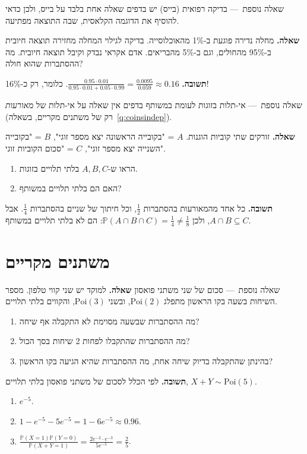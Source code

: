 \documentclass[11pt,a4paper]{report}
\newcommand{\PP}{\mathbb{P}}
\newcommand{\Poi}{\mathrm{Poi}}
\newcommand{\dash}{{\rmfamily —}}
\begin{document}
\begin{suggestion}{שאלה נוספת~\dash{} בדיקה רפואית (בייס)}
יש בדפים שאלה אחת בלבד על בייס, ולכן כדאי להוסיף את הדוגמה הקלאסית, שבה התוצאה מפתיעה.

\textbf{שאלה.} מחלה נדירה פוגעת ב-1\% מהאוכלוסייה. בדיקה לגילוי המחלה מחזירה תוצאה חיובית ב-95\% מהחולים, וגם ב-5\% מהבריאים. אדם אקראי נבדק וקיבל תוצאה חיובית. מה ההסתברות שהוא חולה?

\textbf{תשובה.} $\frac{0.95\cdot0.01}{0.95\cdot0.01+0.05\cdot0.99}=\frac{0.0095}{0.059}\approx0.16$. כלומר, רק כ-16\%!
\end{suggestion}

\begin{suggestion}{שאלה נוספת~\dash{} אי-תלות בזוגות לעומת במשותף}
בדפים אין שאלה על אי-תלות של \emph{מאורעות} (רק של משתנים מקריים, בשאלה~\ref{q:coinsindep}).

\textbf{שאלה.} זורקים שתי קוביות הוגנות. $A$ = "בקובייה הראשונה יצא מספר זוגי", $B$ = "בקובייה השנייה יצא מספר זוגי", $C$ = "סכום הקוביות זוגי".
\begin{enumerate}[label=(\alph*),itemsep=1pt,topsep=2pt]
  \item הראו ש-$A,B,C$ בלתי תלויים בזוגות.
  \item האם הם בלתי תלויים במשותף?
\end{enumerate}

\textbf{תשובה.} כל אחד מהמאורעות בהסתברות $\frac12$, וכל חיתוך של שניים בהסתברות $\frac14$. אבל $A\cap B\subseteq C$, ולכן $\PP(A\cap B\cap C)=\frac14\neq\frac18$: הם לא בלתי תלויים במשותף.
\end{suggestion}

\chapter{משתנים מקריים}
\begin{suggestion}{שאלה נוספת~\dash{} סכום של שני משתני פואסון}
\textbf{שאלה.} למוקד יש שני קווי טלפון. מספר השיחות בשעה בקו הראשון מתפלג $\Poi(2)$, ובשני $\Poi(3)$, והקווים בלתי תלויים.
\begin{enumerate}[label=(\alph*),itemsep=1pt,topsep=2pt]
  \item מה ההסתברות שבשעה מסוימת לא התקבלה אף שיחה?
  \item מה ההסתברות שהתקבלו לפחות 2 שיחות בסך הכול?
  \item בהינתן שהתקבלה בדיוק שיחה אחת, מה ההסתברות שהיא הגיעה בקו הראשון?
\end{enumerate}

\textbf{תשובה.} לפי הכלל לסכום של משתני פואסון בלתי תלויים, $X+Y\sim\Poi(5)$.
\begin{enumerate}[label=(\alph*),itemsep=1pt,topsep=2pt]
  \item $e^{-5}$.
  \item $1-e^{-5}-5e^{-5}=1-6e^{-5}\approx0.96$.
  \item $\frac{\PP(X=1)\PP(Y=0)}{\PP(X+Y=1)}=\frac{2e^{-2}\cdot e^{-3}}{5e^{-5}}=\frac25$.
\end{enumerate}
\end{suggestion}
\end{document}
